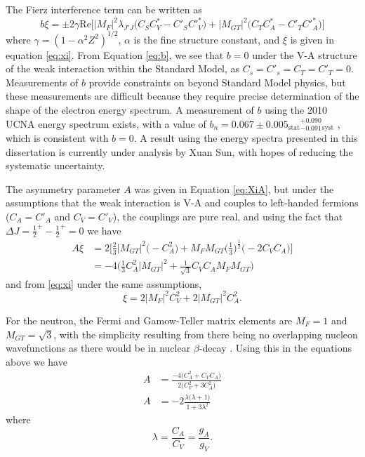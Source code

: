The Fierz interference term can be written as
\begin{equation}
  b\xi = \pm 2\gamma \mathrm{Re}\bigg[|M_{F}|^2 \lambda_{J'J}\big(C_SC^*_V-C'_SC'^*_V \big) 
    + |M_{GT}|^2\big(C_TC^*_A-C'_TC'^*_A \big) \bigg]
  \label{eq:b}
\end{equation}
where $\gamma = (1-\alpha ^2 Z^2)^{1/2}$, $\alpha$ is the fine structure constant, and $\xi$ is given in
equation \ref{eq:xi}. From Equation \ref{eq:b}, we see that $b=0$ under the V-A structure
of the weak interaction within the Standard Model, as
$C_s = C'_s = C_T = C'_T = 0$. Measurements of $b$ provide constraints on
beyond Standard Model physics, but these measurements are difficult because they
require precise determination of the shape of the electron energy spectrum. A measurement of
$b$ using the 2010 UCNA energy spectrum exists, with a value of
$b_n = 0.067 \pm 0.005_{\mathrm{stat}}{}^{+ 0.090}_{-0.091}{}_{\mathrm{syst}}$ \cite{hickerson2017}, which is consistent with
$b=0$. A result using the energy
spectra presented in this dissertation is currently under analysis by Xuan Sun, with hopes of reducing the
systematic uncertainty.

The asymmetry parameter $A$ was given in Equation \ref{eq:XiA}, but under the assumptions that the
weak interaction is V-A and couples to left-handed fermions ($C_A=C'_A$ and $C_V=C'_V$), the couplings
are pure real, and using the fact that
$\Delta J = {\frac{1}{2}}^+ - {\frac{1}{2}}^+ = 0$ we have
%
\begin{align}
  A\xi &= 2\bigg[ \frac{2}{3} |M_{GT}|^2 \Big(-C_A^2\Big) 
    + M_FM_{GT}\Big(\frac{1}{3}\Big)^{\frac{1}{2}}\big(-2C_VC_A \big) \bigg] \\
  &=-4 \bigg( \frac{1}{3}C_A^2|M_{GT}|^2 + \frac{1}{\sqrt{3}} C_VC_A M_FM_{GT} \bigg)
  \label{eq:XiAsimple}
\end{align}
%
and from \ref{eq:xi} under the same assumptions,
%
\begin{equation}
  \xi = 2|M_F|^2C_V^2+2|M_{GT}|^2C_A^2.
\end{equation}
%

For the neutron, the Fermi and Gamow-Teller matrix elements are $M_F=1$ and
$M_{GT} = \sqrt{3}$, with the simplicity resulting from there being no
overlapping nucleon wavefunctions as there would be in nuclear $\beta$-decay
\cite{grotz1990}. Using this in the equations above we have
%
\begin{align}
  A & =\frac{-4 \big( C_A^2 +  C_VC_A \big)}{2 \big(C_V^2 + 3C_A^2\big)} \\
  A & = -2 \frac{ \lambda \big(\lambda+1\big)}{ 1 + 3\lambda^2}
\end{align}
%
where
%
\begin{equation}
  \lambda = \frac{C_A}{C_V} = \frac{g_A}{g_V}.
\end{equation}

